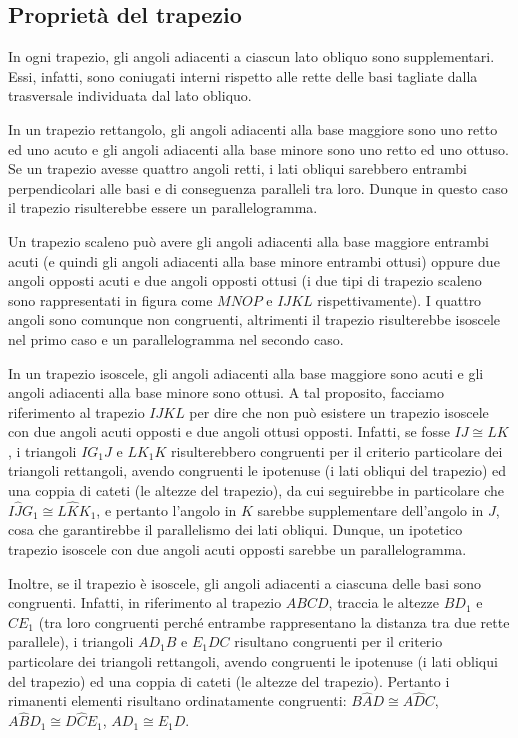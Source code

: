 \subsection{Proprietà del trapezio}

In ogni trapezio, gli angoli adiacenti a ciascun lato obliquo sono supplementari. Essi, infatti, sono coniugati interni rispetto alle rette delle basi tagliate dalla trasversale individuata dal lato obliquo.

In un trapezio rettangolo, gli angoli adiacenti alla base maggiore sono uno retto ed uno acuto e gli angoli adiacenti alla base minore sono uno retto ed uno ottuso. Se un trapezio avesse quattro angoli retti, i lati obliqui sarebbero entrambi perpendicolari alle basi e di conseguenza paralleli tra loro. Dunque in questo caso il trapezio risulterebbe essere un parallelogramma.

Un trapezio scaleno può avere gli angoli adiacenti alla base maggiore entrambi acuti (e quindi gli angoli adiacenti alla base minore entrambi ottusi) oppure due angoli opposti acuti e due angoli opposti ottusi (i due tipi di trapezio scaleno sono rappresentati in figura come $MNOP$ e $IJKL$ rispettivamente). I quattro angoli sono comunque non congruenti, altrimenti il trapezio risulterebbe isoscele nel primo caso e un parallelogramma nel secondo caso.

In un trapezio isoscele, gli angoli adiacenti alla base maggiore sono acuti e gli angoli adiacenti alla base minore sono ottusi. 
A tal proposito, facciamo riferimento al trapezio $IJKL$ per dire che non può esistere un trapezio isoscele con due angoli acuti opposti e due angoli ottusi opposti. Infatti, se fosse $IJ\cong LK$, i triangoli $IG_1J$ e $LK_1K$ risulterebbero congruenti per il criterio particolare dei triangoli rettangoli, avendo congruenti le ipotenuse (i lati obliqui del trapezio) ed una coppia di cateti (le altezze del trapezio), da cui seguirebbe in particolare che $I\widehat{J}G_1\cong L\widehat{K}K_1$, e pertanto l'angolo in $K$ sarebbe supplementare dell'angolo in $J$, cosa che garantirebbe il parallelismo dei lati obliqui. Dunque, un ipotetico trapezio isoscele con due angoli acuti opposti sarebbe un parallelogramma.

Inoltre, se il trapezio è isoscele, gli angoli adiacenti a ciascuna delle basi sono congruenti. 
Infatti, in riferimento al trapezio $ABCD$, traccia le altezze $BD_1$ e $CE_1$ (tra loro congruenti perché entrambe rappresentano la distanza tra due rette parallele), i triangoli $AD_1B$ e $E_1DC$ risultano congruenti per il criterio particolare dei triangoli rettangoli, avendo congruenti le ipotenuse (i lati obliqui del trapezio) ed una coppia di cateti (le altezze del trapezio). Pertanto i rimanenti elementi risultano ordinatamente congruenti: $B\widehat{A}D\cong A\widehat{D}C$, $A\widehat{B}D_1\cong D\widehat{C}E_1$, $AD_1\cong E_1D$.

